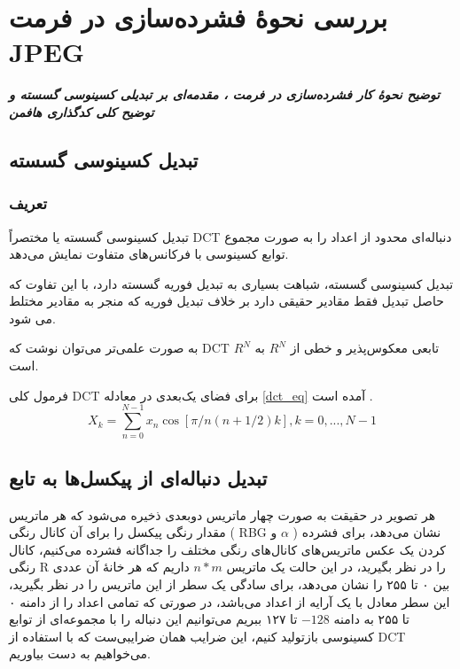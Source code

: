 \chapter{بررسی نحوهٔ فشرده‌سازی در فرمت JPEG}
\noindent
\textbf{
	\textit{
        توضیح نحوهٔ کار فشرده‌سازی در فرمت ، 
        مقدمه‌ای بر تبدیلی کسینوسی گسسته و 
        توضیح کلی کدگذاری هافمن
	}
}
\pagebreak

\section{تبدیل کسینوسی گسسته}

\subsection{
تعریف 
}

تبدیل کسینوسی گسسته 
یا مختصراً
 DCT دنباله‌ای محدود از اعداد را به‌ صورت مجموع توابع کسینوسی با فرکانس‌های متفاوت نمایش می‌دهد.

 
 تبدیل کسینوسی گسسته، شباهت بسیاری به تبدیل فوریه گسسته دارد، با این تفاوت که حاصل تبدیل فقط مقادیر حقیقی دارد بر خلاف تبدیل فوریه که منجر به مقادیر مختلط می شود.

 به صورت علمی‌تر می‌توان نوشت که 
 DCT 
 تابعی معکوس‌پذیر و خطی از 
 $R^N$ 
 به 
 $R^N$
 است.

 فرمول کلی DCT 
 برای فضای یک‌بعدی در معادله
 \ref{dct_eq} آمده
 است
\cite{dct}.
 \begin{equation}
 X_k = \sum_{n = 0}^{N - 1} x_n \cos [\pi / n  (n + 1/2)k]
 , k = 0, ..., N - 1
 \label{dct_eq}
 \end{equation}

 \section{تبدیل دنباله‌ای از پیکسل‌ها به تابع}
هر تصویر در حقیقت به صورت چهار ماتریس دوبعدی ذخیره می‌شود که هر ماتریس مقدار رنگی پیکسل را برای آن کانال رنگی
(
RBG و $\alpha$
)
نشان می‌دهد، برای فشرده کردن یک عکس ماتریس‌های کانال‌های رنگی مختلف را جداگانه فشرده می‌کنیم، کانال رنگی R 
را در نظر بگیرید، در این حالت یک ماتریس 
$n * m$ 
داریم که هر خانهٔ آن عددی بین ۰ تا ۲۵۵ را نشان می‌دهد، برای سادگی یک سطر از این ماتریس را در نظر بگیرید، این سطر معادل با یک 
آرایه از اعداد می‌باشد، در صورتی که تمامی اعداد را از دامنه ۰ تا ۲۵۵ به دامنه
$ -128 $ تا ۱۲۷ ببریم می‌توانیم این دنباله را با مجموعه‌ای از 
توابع کسینوسی بازتولید کنیم، این ضرایب همان ضرایبی‌ست که با استفاده از DCT 
می‌خواهیم به دست بیاوریم.


